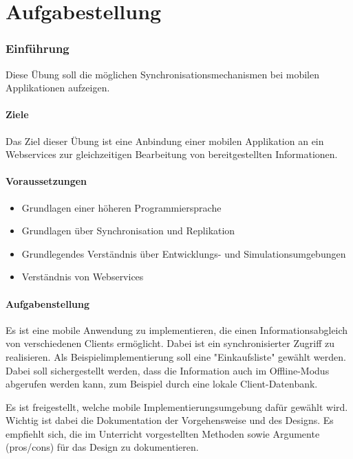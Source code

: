 
\part{Aufgabestellung}

\section{Einführung}

Diese Übung soll die möglichen Synchronisationsmechanismen bei mobilen Applikationen aufzeigen.
\subsection{Ziele}

Das Ziel dieser Übung ist eine Anbindung einer mobilen Applikation an ein Webservices zur gleichzeitigen Bearbeitung von bereitgestellten Informationen.

\subsection{Voraussetzungen}
\begin{itemize}
	\item Grundlagen einer höheren Programmiersprache
	\item Grundlagen über Synchronisation und Replikation
	\item Grundlegendes Verständnis über Entwicklungs- und Simulationsumgebungen
	\item Verständnis von Webservices
\end{itemize}

\subsection{Aufgabenstellung}
Es ist eine mobile Anwendung zu implementieren, die einen Informationsabgleich von verschiedenen Clients ermöglicht. Dabei ist ein synchronisierter Zugriff zu realisieren. Als Beispielimplementierung soll eine "Einkaufsliste" gewählt werden. Dabei soll sichergestellt werden, dass die Information auch im Offline-Modus abgerufen werden kann, zum Beispiel durch eine lokale Client-Datenbank.

Es ist freigestellt, welche mobile Implementierungsumgebung dafür gewählt wird. Wichtig ist dabei die Dokumentation der Vorgehensweise und des Designs. Es empfiehlt sich, die im Unterricht vorgestellten Methoden sowie Argumente (pros/cons) für das Design zu dokumentieren.

